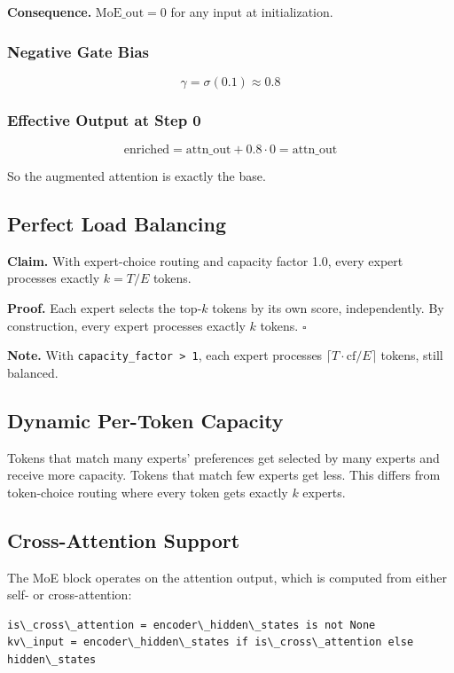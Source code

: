 \textbf{Consequence.} $\text{MoE\_out} = 0$ for any input at initialization.

\subsubsection{Negative Gate Bias}

\[
\gamma = \sigma(0.1) \approx 0.8
\tag{4.13}
\]

\subsubsection{Effective Output at Step 0}

\[
\text{enriched} = \text{attn\_out} + 0.8 \cdot 0 = \text{attn\_out}
\tag{4.14}
\]

So the augmented attention is exactly the base.

\subsection{Perfect Load Balancing}

\textbf{Claim.} With expert-choice routing and capacity factor 1.0, every expert 
processes exactly $k = T / E$ tokens.

\textbf{Proof.} Each expert selects the top-$k$ tokens by its own score, 
independently. By construction, every expert processes exactly $k$ tokens. 
$\square$

\textbf{Note.} With \texttt{capacity\_factor \textgreater{} 1}, each expert processes $\lceil T \cdot 
\text{cf} / E \rceil$ tokens, still balanced.

\subsection{Dynamic Per-Token Capacity}

Tokens that match many experts' preferences get selected by many experts 
and receive more capacity. Tokens that match few experts get less. This 
differs from token-choice routing where every token gets exactly $k$ 
experts.

\subsection{Cross-Attention Support}

The MoE block operates on the attention output, which is computed from 
either self- or cross-attention:

\begin{lstlisting}
is\_cross\_attention = encoder\_hidden\_states is not None
kv\_input = encoder\_hidden\_states if is\_cross\_attention else hidden\_states
\end{lstlisting}

